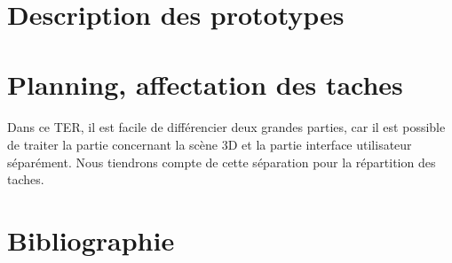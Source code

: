 \documentclass{article}
\begin{document}
\section{Description des prototypes}
\newpage
\section{Planning, affectation des taches}
\paragraph{} Dans ce TER, il est facile de différencier deux grandes parties, car il est possible de traiter la partie concernant la scène 3D et la partie interface utilisateur séparément. Nous tiendrons compte de cette séparation pour la répartition des taches.
\newpage
\section{Bibliographie} 
\end{document}
